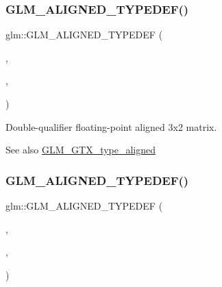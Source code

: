 \subsubsection{\texorpdfstring{G\+L\+M\+\_\+\+A\+L\+I\+G\+N\+E\+D\+\_\+\+T\+Y\+P\+E\+D\+E\+F()}{GLM\_ALIGNED\_TYPEDEF()}\hspace{0.1cm}{\footnotesize\ttfamily [199/209]}}
{\footnotesize\ttfamily glm\+::\+G\+L\+M\+\_\+\+A\+L\+I\+G\+N\+E\+D\+\_\+\+T\+Y\+P\+E\+D\+EF (\begin{DoxyParamCaption}\item[{\hyperlink{group__gtc__type__precision_ga311a3bf48bfe2c95150e9f71db9063c5}{f64mat3x2}}]{,  }\item[{aligned\+\_\+f64mat3x2}]{,  }\item[{32}]{ }\end{DoxyParamCaption})}

Double-\/qualifier floating-\/point aligned 3x2 matrix. \begin{DoxySeeAlso}{See also}
\hyperlink{group__gtx__type__aligned}{G\+L\+M\+\_\+\+G\+T\+X\+\_\+type\+\_\+aligned} 
\end{DoxySeeAlso}
\mbox{\label{group__gtx__type__aligned_gad1dda32ed09f94bfcf0a7d8edfb6cf13}} 
\subsubsection{\texorpdfstring{G\+L\+M\+\_\+\+A\+L\+I\+G\+N\+E\+D\+\_\+\+T\+Y\+P\+E\+D\+E\+F()}{GLM\_ALIGNED\_TYPEDEF()}\hspace{0.1cm}{\footnotesize\ttfamily [200/209]}}
{\footnotesize\ttfamily glm\+::\+G\+L\+M\+\_\+\+A\+L\+I\+G\+N\+E\+D\+\_\+\+T\+Y\+P\+E\+D\+EF (\begin{DoxyParamCaption}\item[{\hyperlink{group__gtc__type__precision_ga3b494201796c4200886e59f9695ecff0}{f64mat3x3}}]{,  }\item[{aligned\+\_\+f64mat3x3}]{,  }\item[{32}]{ }\end{DoxyParamCaption})}

